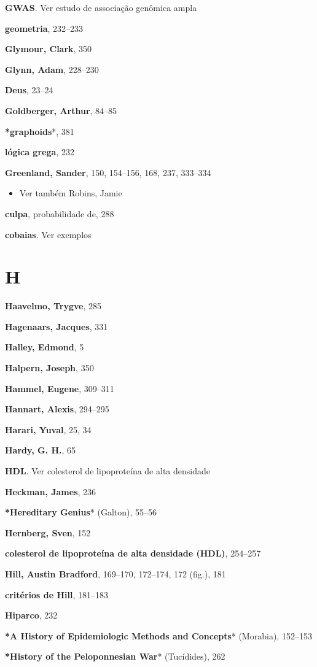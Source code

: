 \documentclass[11pt,a5paper,twoside]{book}
\begin{document}
\textbf{GWAS}. Ver estudo de associação genômica ampla

\textbf{geometria}, 232–233

\textbf{Glymour, Clark}, 350

\textbf{Glynn, Adam}, 228–230

\textbf{Deus}, 23–24

\textbf{Goldberger, Arthur}, 84–85

\textbf{*graphoids}*, 381

\textbf{lógica grega}, 232

\textbf{Greenland, Sander}, 150, 154–156, 168, 237, 333–334

\begin{itemize}
\item Ver também Robins, Jamie
\end{itemize}
\textbf{culpa}, probabilidade de, 288

\textbf{cobaias}. Ver exemplos

\section{H}
\textbf{Haavelmo, Trygve}, 285

\textbf{Hagenaars, Jacques}, 331

\textbf{Halley, Edmond}, 5

\textbf{Halpern, Joseph}, 350

\textbf{Hammel, Eugene}, 309–311

\textbf{Hannart, Alexis}, 294–295

\textbf{Harari, Yuval}, 25, 34

\textbf{Hardy, G. H.}, 65

\textbf{HDL}. Ver colesterol de lipoproteína de alta densidade

\textbf{Heckman, James}, 236

\textbf{*Hereditary Genius}* (Galton), 55–56

\textbf{Hernberg, Sven}, 152

\textbf{colesterol de lipoproteína de alta densidade (HDL)}, 254–257

\textbf{Hill, Austin Bradford}, 169–170, 172–174, 172 (fig.), 181

\textbf{critérios de Hill}, 181–183

\textbf{Hiparco}, 232

\textbf{*A History of Epidemiologic Methods and Concepts}* (Morabia), 152–153

\textbf{*History of the Peloponnesian War}* (Tucídides), 262
\end{document}
